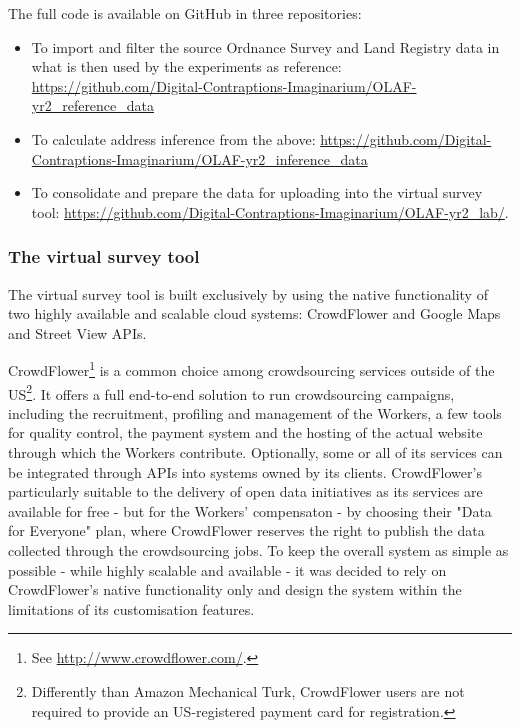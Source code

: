 {        The full code is available on GitHub in three repositories:
        
        \begin{itemize}
            \item To import and filter the source Ordnance Survey and Land Registry data in what is then used by the experiments as reference: \url{https://github.com/Digital-Contraptions-Imaginarium/OLAF-yr2_reference_data}
            \item To calculate address inference from the above: \url{https://github.com/Digital-Contraptions-Imaginarium/OLAF-yr2_inference_data}
            \item To consolidate and prepare the data for uploading into the virtual survey tool: \url{https://github.com/Digital-Contraptions-Imaginarium/OLAF-yr2_lab/}.
        \end{itemize}

    \subsubsection{The virtual survey tool}
    
        The virtual survey tool is built exclusively by using the native functionality of two highly available and scalable cloud systems: CrowdFlower and Google Maps and Street View APIs. 
        
        CrowdFlower\footnote{See \url{http://www.crowdflower.com/}.} is a common choice among crowdsourcing services outside of the US\footnote{Differently than Amazon Mechanical Turk, CrowdFlower users are not required to provide an US-registered payment card for registration.}. It offers a full end-to-end solution to run crowdsourcing campaigns, including the recruitment, profiling and management of the Workers, a few tools for quality control, the payment system and the hosting of the actual website through which the Workers contribute. Optionally, some or all of its services can be integrated through APIs into systems owned by its clients. CrowdFlower's particularly suitable to the delivery of open data initiatives as its services are available for free - but for the Workers' compensaton - by choosing their "Data for Everyone" plan, where CrowdFlower reserves the right to publish the data collected through the crowdsourcing jobs. To keep the overall system as simple as possible - while highly scalable and available - it was decided to rely on CrowdFlower's native functionality only and design the system within the limitations of its customisation features.

}

